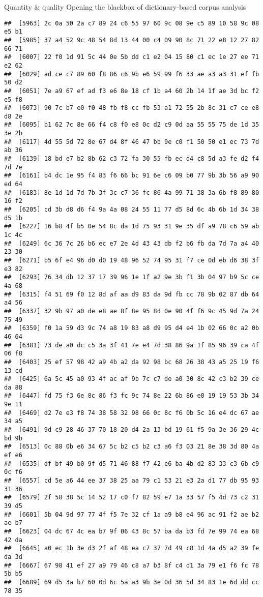 \documentclass[
  ignorenonframetext,
]{beamer}
\begin{document}
\begin{frame}[fragile]{Quantity \& quality \textbar{} Opening the
blackbox of dictionary-based corpus analysis}
\begin{verbatim}
##  [5963] 2c 0a 50 2a c7 89 24 c6 55 97 60 9c 08 9e c5 89 10 58 9c 08 e5 b1
##  [5985] 37 a4 52 9c 48 54 8d 13 44 00 c4 09 90 8c 71 22 e8 12 27 82 66 71
##  [6007] 22 f0 1d 91 5c 44 0e 5b dd c1 e2 04 15 80 c1 ec 1e 27 ee 71 e2 62
##  [6029] ad ce c7 89 60 f8 86 c6 9b e6 59 99 f6 33 ae a3 a3 31 ef fb 50 d2
##  [6051] 7e a9 67 ef ad f3 e6 8e 18 cf 1b a4 60 2b 14 1f ae 3d bc f2 e5 f8
##  [6073] 90 7c b7 e0 f0 48 fb f8 cc fb 53 a1 72 55 2b 8c 31 c7 ce e8 d8 2e
##  [6095] b1 62 7c 8e 66 f4 c8 f0 e8 0c d2 c9 0d aa 55 55 75 de 1d 35 3e 2b
##  [6117] 4d 55 5d 72 8e 67 d4 8f 46 47 bb 9e c0 f1 50 50 e1 ec 73 7d ab 36
##  [6139] 18 bd e7 b2 8b 62 c3 72 fa 30 55 fb ec d4 c8 5d a3 fe d2 f4 7d 7e
##  [6161] b4 dc 1e 95 f4 83 f6 66 bc 91 6e c6 09 b0 77 9b 3b 56 a9 90 ed 64
##  [6183] 8e 1d 1d 7d 7b 3f 3c c7 36 fc 86 4a 99 71 38 3a 6b f8 89 80 16 f2
##  [6205] cd 3b d8 d6 f4 9a 4a 08 24 55 11 77 d5 8d 6c 4b 6b 1d 34 38 d5 1b
##  [6227] 16 b8 4f b5 0e 54 8c da 1d 75 93 31 9e 35 df a9 78 c6 59 ab 1c 4c
##  [6249] 6c 36 7c 26 b6 ec e7 2e 4d 43 43 db f2 b6 fb da 7d 7a a4 40 23 30
##  [6271] b5 6f e4 96 d0 d0 19 48 96 52 74 95 31 f7 ce 0d eb d6 38 3f e3 82
##  [6293] 76 34 db 12 37 17 39 96 1e 1f a2 9e 3b f1 3b 04 97 b9 5c ce 4a 68
##  [6315] f4 51 69 f0 12 8d af aa d9 83 da 9d fb cc 78 9b 02 87 db 64 a4 56
##  [6337] 32 9b 97 a0 de e8 ae 8f 8e 95 8d 0e 90 4f f6 9c 45 9d 7a 24 75 49
##  [6359] f0 1a 59 d3 9c 74 a8 19 83 a8 d9 95 d4 e4 1b 02 66 0c a2 0b 46 64
##  [6381] 73 de a0 dc c5 3a 3f 41 7e e4 7d 38 86 9a 1f 85 96 39 ca 4f 06 f8
##  [6403] 25 ef 57 98 42 a9 4b a2 da 92 98 bc 68 26 38 43 a5 25 19 f6 13 cd
##  [6425] 6a 5c 45 a0 93 4f ac af 9b 7c c7 de a0 30 8c 42 c3 b2 39 ce da 88
##  [6447] fd 75 f3 6e 8c 86 f3 fc 9c 74 8e 22 6b 86 e0 19 19 53 3b 34 9e 11
##  [6469] d2 7e e3 f8 74 38 58 32 98 66 0c 8c f6 0b 5c 16 e4 dc 67 ae 34 a5
##  [6491] 9d c9 28 46 37 70 18 20 d4 2a 13 bd 19 61 f5 9a 3e 36 29 4c bd 9b
##  [6513] 0c 88 0b e6 34 67 5c b2 c5 b2 c3 a6 f3 03 21 8e 38 3d 80 4a ef e6
##  [6535] df bf 49 b0 9f d5 71 46 88 f7 42 e6 ba 4b d2 83 33 c3 6b c9 0c f6
##  [6557] cd 5e a6 44 ee 37 38 25 aa 79 c1 53 21 e3 2a d1 77 db 95 93 31 36
##  [6579] 2f 58 38 5c 14 52 17 c0 f7 82 59 e7 1a 33 57 f5 4d 73 c2 31 39 d5
##  [6601] 5b 04 9d 97 77 4f f5 7e 32 cf 1a a9 b8 e4 96 ac 91 f2 ae b2 ae b7
##  [6623] 04 dc 67 4c ea b7 9f 06 43 8c 57 ba da b3 fd 7e 99 74 ea 68 42 da
##  [6645] a0 ec 1b 3e d3 2f af 48 ea c7 37 7d 49 c8 1d 4a d5 a2 39 fe da 3d
##  [6667] 67 98 41 ef 27 a9 79 46 c8 a7 b3 8f c4 d1 3a 79 e1 f6 fc 78 5b b5
##  [6689] 69 d5 3a b7 60 0d 6c 5a a3 9b 3e 0d 36 5d 34 83 1e 6d dd cc 78 35

\end{verbatim}
\end{frame}
\end{document}
